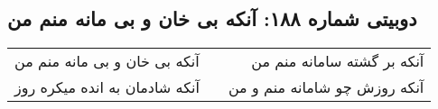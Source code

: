\begin{center}
\section*{دوبیتی شماره ۱۸۸: آنکه بی خان و بی مانه منم من}
\label{sec:188}
\begin{longtable}{l p{0.5cm} r}
آنکه بی خان و بی مانه منم من
&&
آنکه بر گشته سامانه منم من
\\
آنکه شادمان به انده میکره روز
&&
آنکه روزش چو شامانه منم و من
\\
\end{longtable}
\end{center}
